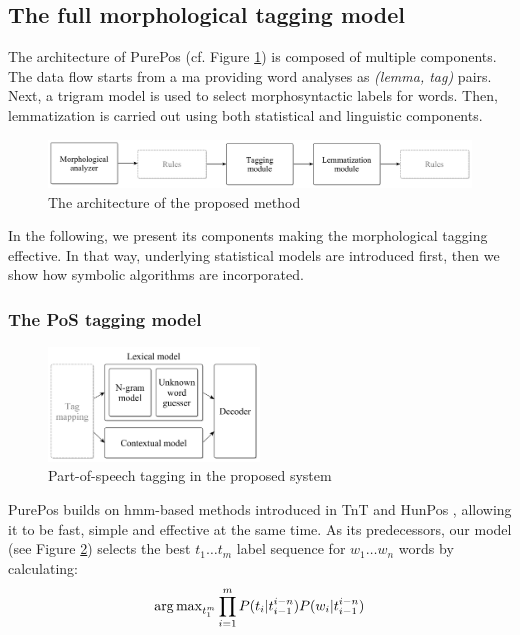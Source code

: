 \subsection{The full morphological tagging model}
\label{sec:purepos}

The architecture of PurePos (cf. Figure \ref{fig:purepos-arch}) is composed of multiple components. 
The data flow starts from a \gls{ma} providing word analyses as \emph{(lemma, tag)} pairs. 
Next, a trigram model is used to select morphosyntactic labels for words. 
Then, lemmatization is carried out using both statistical and linguistic components. 

\begin{figure}[H]
  \centering
  \includegraphics[width=1\textwidth]{MorphTagging/architecture.png} 
  \caption{The architecture of the proposed method}
  \label{fig:purepos-arch}
\end{figure}

In the following, we present its components making the morphological tagging effective. 
In that way,  underlying statistical models are introduced first, then we show how symbolic algorithms are incorporated. 

\subsubsection{The PoS tagging model}

\begin{figure}[H]
  \centering
  \includegraphics[width=0.5\textwidth]{MorphTagging/pos_arch.png} 
  \caption{Part-of-speech tagging in the proposed system}
  \label{fig:pos_arch}
\end{figure}

PurePos builds on \acrshort{hmm}-based methods \cite{Rabiner1989,Samuelsson1993} introduced in TnT \cite{Brants2000} and HunPos \cite{Halacsy2007}, allowing it to be fast, simple and effective at the same time. 
As its predecessors, our model (see Figure \ref{fig:pos_arch}) selects the best $t_1 \dots t_m$ label sequence for $w_1 \dots w_n$ words by calculating:
\begin{equation}
\operatorname{arg\,max}_{t_1^m} \prod_{i=1}^m P(t_i | t_{i-1}^{i-n}) P(w_i|t_{i-1}^{i-n})
\end{equation}

